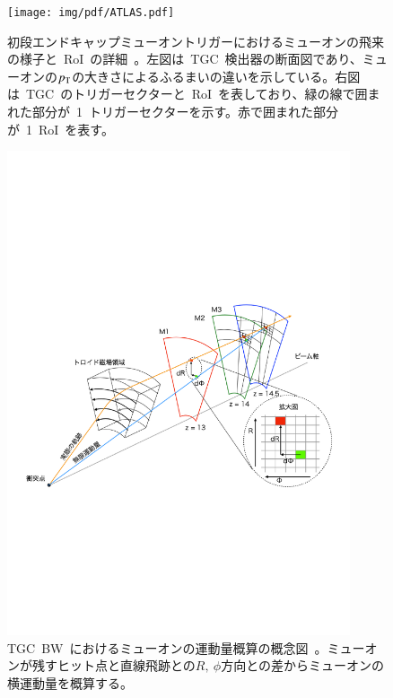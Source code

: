 \begin{figure}[tbp]
        \centering   
        \texttt{[image: img/pdf/ATLAS.pdf]}
        \caption[初段エンドキャップミューオントリガーにおけるミューオンの飛来の様子と~RoI~の詳細]{初段エンドキャップミューオントリガーにおけるミューオンの飛来の様子と~RoI~の詳細~\cite{TR:01}。左図は~TGC~検出器の断面図であり、ミューオンの$p_{\rm{T}}$の大きさによるふるまいの違いを示している。右図は~TGC~のトリガーセクターと~RoI~を表しており、緑の線で囲まれた部分が~1~トリガーセクターを示す。赤で囲まれた部分が~1~RoI~を表す。}
        \label{fig:tgcpt}
\end{figure}

\begin{figure}[tbp]
        \centering   
        \includegraphics[width=0.9\textwidth,page=1]{img/pdf/pttgc.pdf}
        \caption[TGC~BW~におけるミューオンの運動量概算の概念図]{TGC~BW~におけるミューオンの運動量概算の概念図~\cite{MT:03}。ミューオンが残すヒット点と直線飛跡との$R,~\phi$方向との差からミューオンの横運動量を概算する。}
        \label{fig:tgcptt}
\end{figure}

